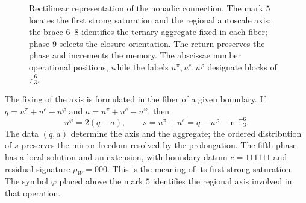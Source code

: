 \begin{figure}[H]
\centering
{}
\caption{Rectilinear representation of the nonadic connection. The mark
\(5\) locates the first strong saturation and the regional
autoscale axis; the brace \(6\)--\(8\) identifies the ternary aggregate
fixed in each fiber; phase \(9\) selects the closure
orientation. The return preserves the phase and increments the memory. The
abscissae number operational positions, while the labels
\(u^\pi,u^e,u^\varphi\) designate blocks of \(\mathbb F_3^6\).}
\label{x_reciprocidad:mono-recta:figura}
\end{figure}



The fixing of the axis is formulated in the fiber of a given boundary. If
\(q=u^\pi+u^e+u^\varphi\) and
\(a=u^\pi+u^e-u^\varphi\), then
\[
 u^\varphi=2(q-a),\qquad s=u^\pi+u^e=q-u^\varphi
 \quad\text{in }\mathbb F_3^6.
\]
The data \((q,a)\) determine the axis and the aggregate; the ordered distribution
of \(s\) preserves the mirror freedom resolved by the prolongation.
The fifth phase has a local solution and an extension, with boundary
datum \(c=111111\) and residual signature \(\rho_W=000\). This is the
meaning of its first strong saturation. The symbol \(\varphi\)
placed above the mark \(5\) identifies the regional axis involved
in that operation.

